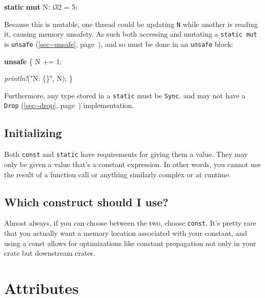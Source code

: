\documentclass[a4paper,]{book}
\renewcommand*{\hyperref}[2][\ar]{%
  \def\ar{#2}%
  #2 (\autoref{#1}, page~\pageref{#1})}
\newenvironment{Shaded}{\begin{snugshade}}{\end{snugshade}}
\newcommand{\KeywordTok}[1]{\textcolor[rgb]{0.13,0.29,0.53}{\textbf{{#1}}}}
\newcommand{\DataTypeTok}[1]{\textcolor[rgb]{0.13,0.29,0.53}{{#1}}}
\newcommand{\DecValTok}[1]{\textcolor[rgb]{0.00,0.00,0.81}{{#1}}}
\newcommand{\StringTok}[1]{\textcolor[rgb]{0.31,0.60,0.02}{{#1}}}
\newcommand{\PreprocessorTok}[1]{\textcolor[rgb]{0.56,0.35,0.01}{\textit{{#1}}}}
\newcommand{\NormalTok}[1]{{#1}}
\begin{document}
\begin{Shaded}
\begin{Highlighting}[]
\KeywordTok{static} \KeywordTok{mut} \NormalTok{N: }\DataTypeTok{i32} \NormalTok{= }\DecValTok{5}\NormalTok{;}
\end{Highlighting}
\end{Shaded}

Because this is mutable, one thread could be updating \texttt{N} while
another is reading it, causing memory unsafety. As such both accessing
and mutating a \texttt{static\ mut} is
\hyperref[sec--unsafe]{\texttt{unsafe}}, and so must be done in an
\texttt{unsafe} block:

\begin{Shaded}
\begin{Highlighting}[]

\KeywordTok{unsafe} \NormalTok{\{}
    \NormalTok{N += }\DecValTok{1}\NormalTok{;}

    \PreprocessorTok{println!}\NormalTok{(}\StringTok{"N: \{\}"}\NormalTok{, N);}
\NormalTok{\}}
\end{Highlighting}
\end{Shaded}

Furthermore, any type stored in a \texttt{static} must be \texttt{Sync},
and may not have a \hyperref[sec--drop]{\texttt{Drop}} implementation.

\subsection{Initializing}\label{initializing}

Both \texttt{const} and \texttt{static} have requirements for giving
them a value. They may only be given a value that's a constant
expression. In other words, you cannot use the result of a function call
or anything similarly complex or at runtime.

\subsection{Which construct should I
use?}\label{which-construct-should-i-use}

Almost always, if you can choose between the two, choose \texttt{const}.
It's pretty rare that you actually want a memory location associated
with your constant, and using a const allows for optimizations like
constant propagation not only in your crate but downstream crates.

\section{Attributes}\label{sec--attributes}
\end{document}
